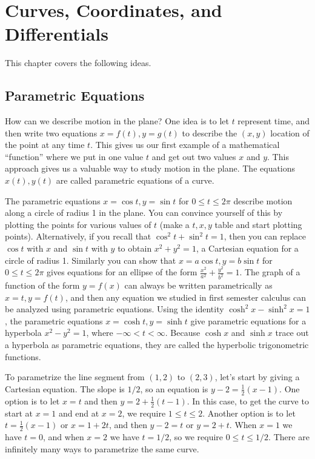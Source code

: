 
\chapter{Curves, Coordinates, and Differentials}

This chapter covers the following ideas. 





\section{Parametric Equations}

How can we describe motion in the plane?  One idea is to let $t$ represent time, and then write two equations $x=f(t),y=g(t)$ to describe the $(x,y)$ location of the point at any time $t$.  This gives us our first example of a mathematical ``function'' where we put in one value $t$ and get out two values $x$ and $y$.  This approach gives us a valuable way to study motion in the plane. The equations $x(t), y(t)$ are called parametric equations of a curve.

The parametric equations $x = \cos t, y=\sin t$ for $0\leq t\leq 2\pi$ describe motion along a circle of radius 1 in the plane.  You can convince yourself of this by plotting the points for various values of $t$ (make a $t,x,y$ table and start plotting points).  Alternatively, if you recall that $\cos^2 t+\sin^2 t = 1$, then you can replace $\cos t$ with $x$ and $\sin t$ with $y$ to obtain $x^2+y^2=1$, a Cartesian equation for a circle of radius 1.  Similarly you can show that $x=a\cos t, y=b\sin t$ for $0\leq t\leq 2\pi$ gives equations for an ellipse of the form $\frac{x^2}{a^2}+\frac{y^2}{b^2}=1$.  The graph of a function of the form $y=f(x)$ can always be written parametrically as $x=t,y=f(t)$, and then any equation we studied in first semester calculus can be analyzed using parametric equations. Using the identity $\cosh^2 x-\sinh^2 x =1$, the parametric equations $x=\cosh t,y=\sinh t$ give parametric equations for a hyperbola $x^2-y^2=1$, where $-\infty<t<\infty$. Because $\cosh x$ and $\sinh x$ trace out a hyperbola as parametric equations, they are called the hyperbolic trigonometric functions.  

To parametrize the line segment from $(1,2)$ to $(2,3)$, let's start by giving a Cartesian equation. The slope is $1/2$, so an equation is $y-2=\frac{1}{2}(x-1)$.  One option is to let $x=t$ and then $y=2+\frac{1}{2}(t-1)$. In this case, to get the curve to start at $x=1$ and end at $x=2$, we require $1\leq t\leq 2$. Another option is to let $t=\frac{1}{2}(x-1)$ or $x=1+2t$, and then $y-2=t$ or $y=2+t$. When $x=1$ we have $t=0$, and when $x=2$ we have $t=1/2$, so we require $0\leq t\leq 1/2$. There are infinitely many ways to parametrize the same curve.


